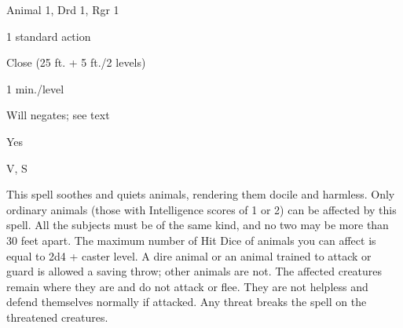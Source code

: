 
\begin{description*}
\item[Level:] Animal 1, Drd 1, Rgr 1
\item[Casting Time:] 1 standard action
\item[Range:] Close (25 ft. + 5 ft./2 levels)
\item[Duration:] 1 min./level
\item[Saving Throw:] Will negates; see text
\item[Spell Resistance:] Yes
\item[Components:] V, S
\end{description*}

This spell soothes and quiets animals, rendering them docile and harmless. Only
ordinary animals (those with Intelligence scores of 1 or 2) can be affected by
this spell. All the subjects must be of the same kind, and no two may be more than
30 feet apart. The maximum number of Hit Dice of animals you can affect is equal
to 2d4 + caster level. A dire animal or an animal trained to attack or guard is
allowed a saving throw; other animals are not.
The affected creatures remain where they are and do not attack or flee. They are
not helpless and defend themselves normally if attacked. Any threat breaks the
spell on the threatened creatures.